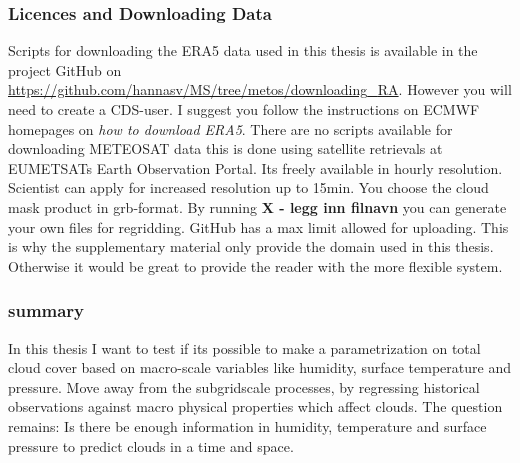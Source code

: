 \subsubsection{Licences and Downloading Data} \label{sec:downloading_data}
Scripts for downloading the ERA5 data used in this thesis is available in the project GitHub on \href{https://github.com/hannasv/MS/tree/metos/downloading{\_}RA}{https://github.com/hannasv/MS/tree/metos/downloading{\_}RA}. However you will need to create a CDS-user. I suggest you follow the instructions on ECMWF homepages on \textit{how to download ERA5}. 
There are no scripts available for downloading METEOSAT data this is done using satellite retrievals at EUMETSATs Earth Observation Portal. Its freely available in hourly resolution. Scientist can apply for increased resolution up to 15min. You choose the cloud mask product in grb-format. By running \textbf{X - legg inn filnavn} you can generate your own files for regridding. GitHub has a max limit allowed for uploading. This is why the supplementary material only provide the domain used in this thesis. Otherwise it would be great to provide the reader with the more flexible system.

\subsubsection{summary}
In this thesis I want to test if its possible to make a parametrization on total cloud cover based on macro-scale variables like humidity, surface temperature and pressure. Move away from the subgridscale processes, by regressing historical observations against macro physical properties which affect clouds. The question remains: Is there be enough information in humidity, temperature and surface pressure to predict clouds in a time and space. 



